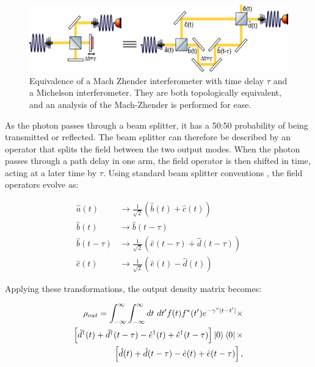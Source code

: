 \begin{figure}[h]
    \centering
    \includegraphics[width=0.8\linewidth]{Figures/MachZhenderMichelson.png}
    \caption{Equivalence of a Mach Zhender interferometer with time delay $\tau$ and a Michelson interferometer. They are both topologically equivalent, and an analysis of the Mach-Zhender is performed for ease.}
    \label{fig:MachZhenderMichelson}
\end{figure}

As the photon passes through a beam splitter, it has a 50:50 probability of being transmitted or reflected. The beam splitter can therefore be described by an operator that splits the field between the two output modes. When the photon passes through a path delay in one arm, the field operator is then shifted in time, acting at a later time by $\tau$. Using standard beam splitter conventions \cite{Gerry2005}, the field operators evolve as:


\begin{align}
    \hat{a}(t) & \rightarrow \frac{1}{\sqrt{2}}\left(\hat{b}(t) + \hat{c}(t) \right) \label{eqn:MZ1}\\
    \hat{b}(t) & \rightarrow \hat{b}(t-\tau) \label{eqn:MZ2}\\
    \hat{b}(t-\tau) & \rightarrow \frac{1}{\sqrt{2}}\left(\hat{e}(t-\tau) + \hat{d}(t-\tau) \right) \label{eqn:MZ3}\\
    \hat{c}(t) & \rightarrow \frac{1}{\sqrt2} \left( \hat{e}(t)-\hat{d}(t)\right) \label{eqn:MZ4}
\end{align}

Applying these transformations, the output density matrix becomes:

\begin{equation}
\begin{aligned}
    \rho_{out} = \int_{-\infty}^{\infty}\int_{-\infty}^{\infty}dt \ dt' f(t)f^*(t') e^{-\gamma^*|t-t'|} \times \\ 
    \left[\hat{d}^{\dagger}(t)+\hat{d}^{\dagger}(t-\tau)-\hat{e}^{\dagger}(t) + \hat{e}^{\dagger}(t-\tau)\right]
    \ket{0} \bra{0} \times \\
    \left[\hat{d}(t)+\hat{d}(t-\tau)-\hat{e}(t) + \hat{e}(t-\tau)\right],
\end{aligned}
\end{equation}


